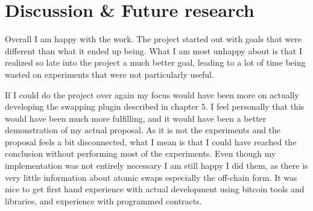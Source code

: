 \chapter{Discussion \& Future research}
Overall I am happy with the work. The project started out with goals that were different than what it ended up being. What I am most unhappy about is that I realized so late into the project a much better goal, leading to a lot of time being wasted on experiments that were not particularly useful. 

If I could do the project over again my focus would have been more on actually developing the swapping plugin described in chapter 5. I feel personally that this would have been much more fulfilling, and it would have been a better demonstration of my actual proposal. As it is not the experiments and the proposal feels a bit disconnected, what I mean is that I could have reached the conclusion without performing most of the experiments. Even though my implementation was not entirely necessary I am still happy I did them, as there is very little information about atomic swaps especially the off-chain form. It was nice to get first hand experience with actual development using bitcoin tools and libraries, and experience with programmed contracts. 